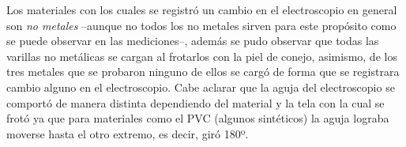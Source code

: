 \documentclass[letterpaper, 11 pt]{article}
\begin{document}
\begin{multicols*}{2}
\begin{table}[H]
\begin{center}
  \caption{Combinaciones varilla-tela con las que se registró carga eléctrica.}
\end{center} 
\end{table}


Los materiales con los cuales se registró un cambio en el electroscopio en general son \textit{no metales} --aunque no todos los no metales sirven para este propósito como se puede observar en las mediciones--, además se pudo observar que todas las varillas no metálicas se cargan al frotarlos con la piel de conejo, asimismo, de los tres metales que se probaron ninguno de ellos se cargó de forma que se registrara cambio alguno en el electroscopio. Cabe aclarar que la aguja del electroscopio se comportó de manera distinta dependiendo del material y la tela con la cual se frotó ya que para materiales como el PVC (algunos sintéticos) la aguja lograba moverse hasta el otro extremo, es decir, giró 180º.


\end{multicols*}
\end{document}
